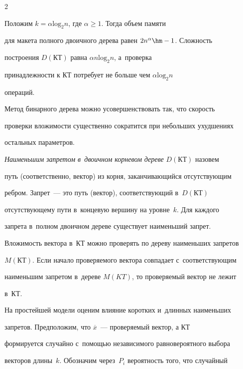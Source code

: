 \begin{multicols}{2}
  


  \smallskip


  


  Положим $k=\alpha \mathrm{log}_2n$, где $\alpha\geq1$. Тогда объем памяти 


для макета полного двоичного дерева равен $2n^\alpha\hm-1$. Сложность 


построения $D(\mathrm{КТ})$ равна $\alpha n \mathrm{log}_2n$, а~проверка 


принадлежности к КТ потребует не больше чем $\alpha\mathrm{log}_2 n$ 


операций. 


  


  Метод бинарного дерева можно усовершенствовать так, что скорость 


проверки вложимости существенно сократится при небольших ухудшениях 


остальных параметров. 


  


  \textit{Наименьшим запретом в~двоичном корневом дереве} $D(\mathrm{КТ})$ назовем 


путь (соответственно, вектор) из корня, заканчивающийся отсутствующим 


реб\-ром. Запрет~--- это путь (вектор), соответствующий в~$D(\mathrm{КТ})$ 


отсутствующему пути в~концевую вершину на уровне~$k$. Для каждого 


запрета в~полном двоичном дереве существует наименьший запрет. 


Вложимость вектора в~КТ можно проверять по дереву наименьших запретов 


$M(\mathrm{КТ})$. Если начало проверяемого вектора совпадает с~со\-от\-вет\-ст\-ву\-ющим 


наименьшим запретом в~дереве $M(KT)$, то проверяемый вектор не лежит 


в~КТ. 


  


  На простейшей модели оценим влияние коротких и~длинных наименьших 


запретов. Предположим, что $\overline{x}$~--- проверяемый вектор, а КТ 


формируется случайно с~помощью независимого равновероятно\-го выбора 


векторов длины~$k$. Обозначим через~$P_i$ вероятность того, что случайный 



\end{multicols}
